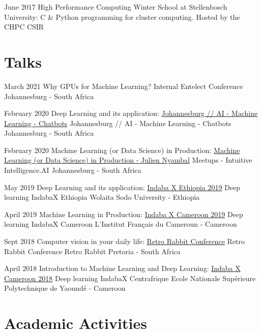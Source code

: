 \documentclass[11pt, letterpaper]{moderncv}        %
\begin{document}
\cventry
{June 2017}
{High Performance Computing Winter School at Stellenbosch University: C \& Python programming for cluster computing.}
{Hosted by the CHPC}
{CSIR}
{}
{}
			
\vspace{1mm}


\section{Talks}

\cventry
{March 2021}
{Why GPUs for Machine Learning?}
{Internal Entelect Conference}
{Johannesburg - South Africa}
{}
{}

\cventry
{February 2020}
{Deep Learning and its application: \href{https://www.meetup.com/Johannesburg-Artificial-Intelligence-Meetup/events/268234198/}{Johannesburg // AI - Machine Learning - Chatbots}}
{Johannesburg // AI - Machine Learning - Chatbots}
{Johannesburg - South Africa}
{}
{}

\cventry
{February 2020}
{Machine Learning (or Data Science) in Production: \href{https://www.frenchtechsa.com/projects/machine-learning-(or-data-science)-in-production}{Machine Learning (or Data Science) in Production - Julien Nyambal}}
{Meetups - Intuitive Intelligence.AI}
{Johannesburg - South Africa}
{}
{}

\cventry
{May 2019}
{Deep Learning and its application: \href{https://sites.google.com/view/indabaxethiopia2019/speakers?authuser=0}{Indaba X Ethiopia 2019}}
{Deep learning IndabaX Ethiopia}
{Wolaita Sodo University - Ethiopia}
{}
{}

\cventry
{April 2019}
{Machine Learning in Production:    \href{https://indabaxcameroon.github.io}{Indaba X Cameroon 2019}}
{Deep learning IndabaX Cameroon}
{L'Institut Français du Cameroun - Cameroon}
{}
{}


\cventry
{Sept 2018}
{Computer vision in your daily life: \href{https://www.youtube.com/watch?v=0Z--tiJ3FyE}
	{Retro Rabbit Conference}}
{Retro Rabbit Conference}
{Retro Rabbit Pretoria - South Africa}
{}
{}

\cventry
{April 2018}
{Introduction to Machine Learning and Deep Learning: \href{http://www.deeplearningindaba.com/indabax-centrafrique.html}{Indaba X Cameroon 2018}}
{Deep learning IndabaX Centrafrique}
{Ecole Nationale Supérieure Polytechnique de Yaoundé - Cameroon}
{}
{}
	
\vspace{9mm}	

\section{Academic Activities}	
\end{document}
